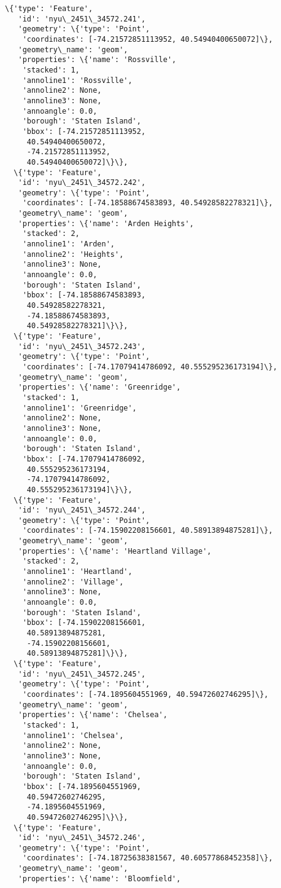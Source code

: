 \documentclass[11pt]{article}
\begin{document}
\begin{tcolorbox}[breakable, size=fbox, boxrule=.5pt, pad at break*=1mm, opacityfill=0]
\begin{Verbatim}[commandchars=\\\{\}]
  \{'type': 'Feature',
   'id': 'nyu\_2451\_34572.241',
   'geometry': \{'type': 'Point',
    'coordinates': [-74.21572851113952, 40.54940400650072]\},
   'geometry\_name': 'geom',
   'properties': \{'name': 'Rossville',
    'stacked': 1,
    'annoline1': 'Rossville',
    'annoline2': None,
    'annoline3': None,
    'annoangle': 0.0,
    'borough': 'Staten Island',
    'bbox': [-74.21572851113952,
     40.54940400650072,
     -74.21572851113952,
     40.54940400650072]\}\},
  \{'type': 'Feature',
   'id': 'nyu\_2451\_34572.242',
   'geometry': \{'type': 'Point',
    'coordinates': [-74.18588674583893, 40.54928582278321]\},
   'geometry\_name': 'geom',
   'properties': \{'name': 'Arden Heights',
    'stacked': 2,
    'annoline1': 'Arden',
    'annoline2': 'Heights',
    'annoline3': None,
    'annoangle': 0.0,
    'borough': 'Staten Island',
    'bbox': [-74.18588674583893,
     40.54928582278321,
     -74.18588674583893,
     40.54928582278321]\}\},
  \{'type': 'Feature',
   'id': 'nyu\_2451\_34572.243',
   'geometry': \{'type': 'Point',
    'coordinates': [-74.17079414786092, 40.555295236173194]\},
   'geometry\_name': 'geom',
   'properties': \{'name': 'Greenridge',
    'stacked': 1,
    'annoline1': 'Greenridge',
    'annoline2': None,
    'annoline3': None,
    'annoangle': 0.0,
    'borough': 'Staten Island',
    'bbox': [-74.17079414786092,
     40.555295236173194,
     -74.17079414786092,
     40.555295236173194]\}\},
  \{'type': 'Feature',
   'id': 'nyu\_2451\_34572.244',
   'geometry': \{'type': 'Point',
    'coordinates': [-74.15902208156601, 40.58913894875281]\},
   'geometry\_name': 'geom',
   'properties': \{'name': 'Heartland Village',
    'stacked': 2,
    'annoline1': 'Heartland',
    'annoline2': 'Village',
    'annoline3': None,
    'annoangle': 0.0,
    'borough': 'Staten Island',
    'bbox': [-74.15902208156601,
     40.58913894875281,
     -74.15902208156601,
     40.58913894875281]\}\},
  \{'type': 'Feature',
   'id': 'nyu\_2451\_34572.245',
   'geometry': \{'type': 'Point',
    'coordinates': [-74.1895604551969, 40.59472602746295]\},
   'geometry\_name': 'geom',
   'properties': \{'name': 'Chelsea',
    'stacked': 1,
    'annoline1': 'Chelsea',
    'annoline2': None,
    'annoline3': None,
    'annoangle': 0.0,
    'borough': 'Staten Island',
    'bbox': [-74.1895604551969,
     40.59472602746295,
     -74.1895604551969,
     40.59472602746295]\}\},
  \{'type': 'Feature',
   'id': 'nyu\_2451\_34572.246',
   'geometry': \{'type': 'Point',
    'coordinates': [-74.18725638381567, 40.60577868452358]\},
   'geometry\_name': 'geom',
   'properties': \{'name': 'Bloomfield',

\end{Verbatim}
\end{tcolorbox}
\end{document}
